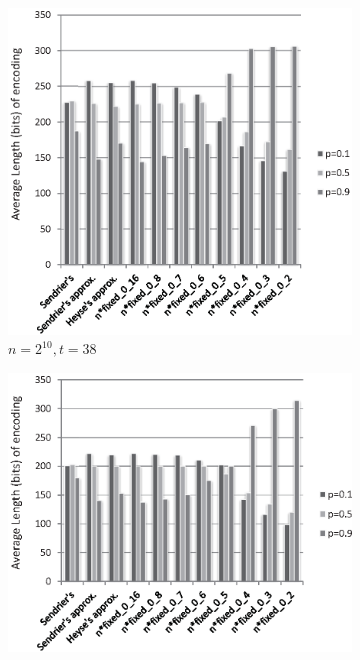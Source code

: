 \documentclass[10pt,journal,compsoc]{IEEEtran}
\begin{document}
\begin{figure}[!htb]
\centering
\begin{subfigure}{.42\textwidth}\centering
\includegraphics[width=\textwidth,height=.27\textheight]{./fig/best_d-10-38.eps}
\caption{$n=2^{10},t=38$}
\end{subfigure}
\hfill
\begin{subfigure}{.42\textwidth}\centering
\includegraphics[width=\textwidth,height=.27\textheight]{./fig/best_d-11-27.eps}

\end{subfigure}
\end{figure}
\end{document}
